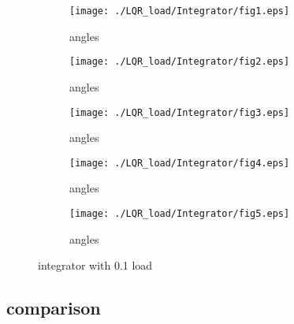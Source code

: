 \begin{figure}[H]
	\centering
	\begin{subfigure}[b]{0.3\textwidth}
		\texttt{[image: ./LQR\_load/Integrator/fig1.eps]}
		\caption{angles}
	\end{subfigure}
	\begin{subfigure}[b]{0.3\textwidth}
		\texttt{[image: ./LQR\_load/Integrator/fig2.eps]}
		\caption{angles}
	\end{subfigure}
	\begin{subfigure}[b]{0.3\textwidth}
		\texttt{[image: ./LQR\_load/Integrator/fig3.eps]}
		\caption{angles}
	\end{subfigure}
	\begin{subfigure}[b]{0.3\textwidth}
		\texttt{[image: ./LQR\_load/Integrator/fig4.eps]}
		\caption{angles}
	\end{subfigure}
	\begin{subfigure}[b]{0.3\textwidth}
		\texttt{[image: ./LQR\_load/Integrator/fig5.eps]}
		\caption{angles}
	\end{subfigure}
	\caption{integrator with 0.1 load}\label{fig:Integrator with load}
\end{figure}

\subsection{comparison}